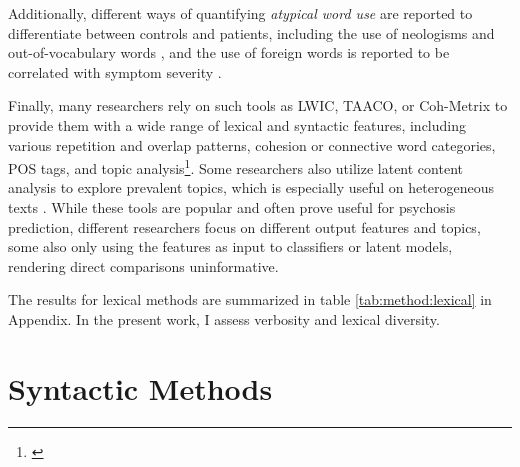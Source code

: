 Additionally, different ways of quantifying \textit{atypical word use} are reported to differentiate between controls and patients, including the use of neologisms \citep{just2019coherence, just2020modeling} and out-of-vocabulary words \citep{just2020modeling}, and the use of foreign words is reported to be correlated with symptom severity \citep{jeong2023exploring}.

Finally, many researchers rely on such tools as LWIC, TAACO, or Coh-Metrix to provide them with a wide range of lexical and syntactic features, including various repetition and overlap patterns, cohesion or connective word categories, POS tags, and topic analysis\footnote{\cite{mitchell2015quantifying, gupta2018automated, vail2018toward, willits2018evidence, just2020modeling, mota2022happy, girard2022computational, liang2022widespread, minor2023automated}}. Some researchers also utilize latent content analysis to explore prevalent topics, which is especially useful on heterogeneous texts \citep{mitchell2015quantifying, rezaii2019machine}. While these tools are popular and often prove useful for psychosis prediction, different researchers focus on different output features and topics, some also only using the features as input to classifiers or latent models, rendering direct comparisons uninformative. 

The results for lexical methods are summarized in table \ref{tab:method:lexical} in Appendix. In the present work, I assess verbosity and lexical diversity.  


\section{Syntactic Methods}
\label{sec:review:syntactic}


